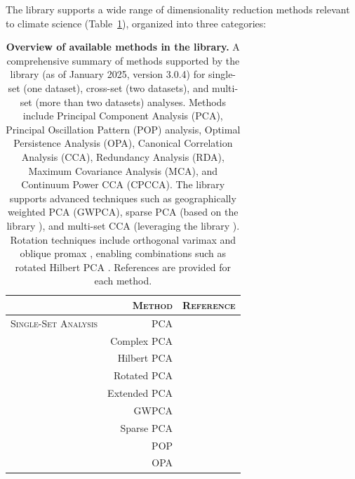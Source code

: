 The library supports a wide range of dimensionality reduction methods relevant to climate science (Table~\ref{tab:xeofs:methods}), organized into three categories:

\begin{table}[t!]
    \caption[Overview of available methods in the  library.]{\textbf{Overview of available methods in the  library.} A comprehensive summary of methods supported by the  library (as of January 2025, version 3.0.4) for single-set (one dataset), cross-set (two datasets), and multi-set (more than two datasets) analyses. Methods include Principal Component Analysis (PCA), Principal Oscillation Pattern (POP) analysis, Optimal Persistence Analysis (OPA), Canonical Correlation Analysis (CCA), Redundancy Analysis (RDA), Maximum Covariance Analysis (MCA), and Continuum Power CCA (CPCCA). The library supports advanced techniques such as geographically weighted PCA (GWPCA), sparse PCA (based on the  library \cite{erichson_randomized_2019}), and multi-set CCA (leveraging the  library \cite{chapman_cca-zoo_2021}). Rotation techniques include orthogonal varimax \cite{kaiser_varimax_1958} and oblique promax \cite{hendrickson_promax_1964}, enabling combinations such as rotated Hilbert PCA \cite[e.g.][]{horel_complex_1984}. References are provided for each method.}
    \centering
    \label{tab:xeofs:methods}
    \begin{tabular}{l r c}
        \toprule
        & \textsc{Method} & \textsc{Reference} \\ 
        \midrule
        \textsc{Single-Set Analysis} & PCA & \cite{pearson_lines_1901,hotelling_relations_1936,lorenz_empirical_1956} \\
        & Complex PCA & \cite{kundu_three-dimensional_1976,storch_statistical_1999} \\
        & Hilbert PCA & \cite{rasmusson_biennial_1981,barnett_interaction_1983,horel_rotated_1981} \\
        & Rotated PCA & \cite{horel_rotated_1981,richman_obliquely_1981} \\
        & Extended PCA & \cite{weare_examples_1982,broomhead_extracting_1986} \\
        & GWPCA & \cite{harris_geographically_2011} \\
        & Sparse PCA & \cite{erichson_sparse_2020}  \\
        & POP & \cite{hasselmann_pips_1988}  \\ 
        & OPA & \cite{delsole_optimally_2001,delsole_low-frequency_2006}  \\ 

\end{tabular}
\end{table}
